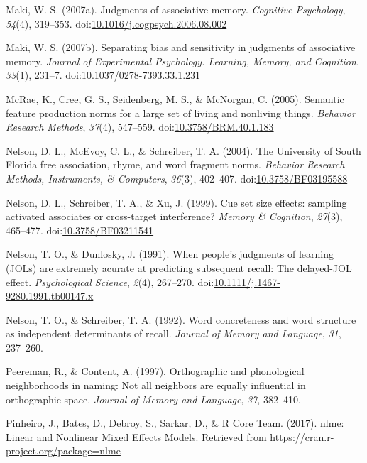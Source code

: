\documentclass[english,man]{apa6}
\theoremstyle{definition}
\theoremstyle{definition}
\theoremstyle{definition}
\theoremstyle{remark}
\begin{document}
\hypertarget{ref-Maki2007a}{}
Maki, W. S. (2007a). Judgments of associative memory. \emph{Cognitive
Psychology}, \emph{54}(4), 319--353.
doi:\href{https://doi.org/10.1016/j.cogpsych.2006.08.002}{10.1016/j.cogpsych.2006.08.002}

\hypertarget{ref-Maki2007}{}
Maki, W. S. (2007b). Separating bias and sensitivity in judgments of
associative memory. \emph{Journal of Experimental Psychology. Learning,
Memory, and Cognition}, \emph{33}(1), 231--7.
doi:\href{https://doi.org/10.1037/0278-7393.33.1.231}{10.1037/0278-7393.33.1.231}

\hypertarget{ref-McRae2005}{}
McRae, K., Cree, G. S., Seidenberg, M. S., \& McNorgan, C. (2005).
Semantic feature production norms for a large set of living and
nonliving things. \emph{Behavior Research Methods}, \emph{37}(4),
547--559.
doi:\href{https://doi.org/10.3758/BRM.40.1.183}{10.3758/BRM.40.1.183}

\hypertarget{ref-Nelson2004}{}
Nelson, D. L., McEvoy, C. L., \& Schreiber, T. A. (2004). The University
of South Florida free association, rhyme, and word fragment norms.
\emph{Behavior Research Methods, Instruments, \& Computers},
\emph{36}(3), 402--407.
doi:\href{https://doi.org/10.3758/BF03195588}{10.3758/BF03195588}

\hypertarget{ref-Nelson1999}{}
Nelson, D. L., Schreiber, T. A., \& Xu, J. (1999). Cue set size effects:
sampling activated associates or cross-target interference? \emph{Memory
\& Cognition}, \emph{27}(3), 465--477.
doi:\href{https://doi.org/10.3758/BF03211541}{10.3758/BF03211541}

\hypertarget{ref-Nelson1991}{}
Nelson, T. O., \& Dunlosky, J. (1991). When people's judgments of
learning (JOLs) are extremely acurate at predicting subsequent recall:
The delayed-JOL effect. \emph{Psychological Science}, \emph{2}(4),
267--270.
doi:\href{https://doi.org/10.1111/j.1467-9280.1991.tb00147.x}{10.1111/j.1467-9280.1991.tb00147.x}

\hypertarget{ref-Nelson1992}{}
Nelson, T. O., \& Schreiber, T. A. (1992). Word concreteness and word
structure as independent determinants of recall. \emph{Journal of Memory
and Language}, \emph{31}, 237--260.

\hypertarget{ref-Peereman1997}{}
Peereman, R., \& Content, A. (1997). Orthographic and phonological
neighborhoods in naming: Not all neighbors are equally influential in
orthographic space. \emph{Journal of Memory and Language}, \emph{37},
382--410.

\hypertarget{ref-Pinheiro2017}{}
Pinheiro, J., Bates, D., Debroy, S., Sarkar, D., \& R Core Team. (2017).
nlme: Linear and Nonlinear Mixed Effects Models. Retrieved from
\url{https://cran.r-project.org/package=nlme}
\end{document}
